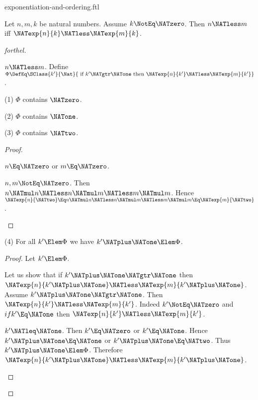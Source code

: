 \documentclass{stex}
\begin{document}
\begin{smodule}{exponentiation-and-ordering.ftl}

\begin{proposition}[forthel]
  Let $n, m, k$ be natural numbers.
  Assume $k \NotEq \NATzero$.
  Then $n \NATless m$ iff $\NATexp{n}{k} \NATless \NATexp{m}{k}$.
\end{proposition}
\begin{proof}[forthel]
  \begin{case}{$n \NATless m$.}
    Define $\Phi \DefEq \SClass{k'}{\Nat}{\text{ if }k' \NATgtr \NATone\text{ then }\NATexp{n}{k'} \NATless \NATexp{m}{k'}}$.

    (1) $\Phi$ contains $\NATzero$.

    (2) $\Phi$ contains $\NATone$.

    (3) $\Phi$ contains $\NATtwo$.
    \begin{proof}
      \begin{case}{$n \Eq \NATzero$ or $m \Eq \NATzero$.} \end{case}

      \begin{case}{$n, m \NotEq \NATzero$.}
        Then $n \NATmul n
          \NATless n \NATmul m
          \NATless m \NATmul m$.
        Hence $\NATexp{n}{\NATtwo}
          \Eq n \NATmul n
          \NATless n \NATmul m
          \NATless m \NATmul m
          \Eq \NATexp{m}{\NATtwo}$.
      \end{case}
    \end{proof}

    (4) For all $k' \Elem \Phi$ we have $k' \NATplus \NATone \Elem \Phi$.
    \begin{proof}
      Let $k' \Elem \Phi$.

      Let us show that if $k' \NATplus \NATone \NATgtr \NATone$ then $\NATexp{n}{k' \NATplus \NATone} \NATless \NATexp{m}{k' \NATplus \NATone}$.
        Assume $k' \NATplus \NATone \NATgtr \NATone$.
        Then $\NATexp{n}{k'} \NATless \NATexp{m}{k'}$.
        Indeed $k' \NotEq \NATzero$ and $if k' \Eq \NATone$ then $\NATexp{n}{k'} \NATless \NATexp{m}{k'}$.

        \begin{case}{$k' \NATleq \NATone$.}
          Then $k' \Eq \NATzero$ or $k' \Eq \NATone$.
          Hence $k' \NATplus \NATone \Eq \NATone$ or $k' \NATplus \NATone \Eq \NATtwo$.
          Thus $k' \NATplus \NATone \Elem \Phi$.
          Therefore $\NATexp{n}{k' \NATplus \NATone} \NATless \NATexp{m}{k' \NATplus \NATone}$.
        \end{case}


\end{proof}
\end{case}
\end{proof}
\end{smodule}
\end{document}
